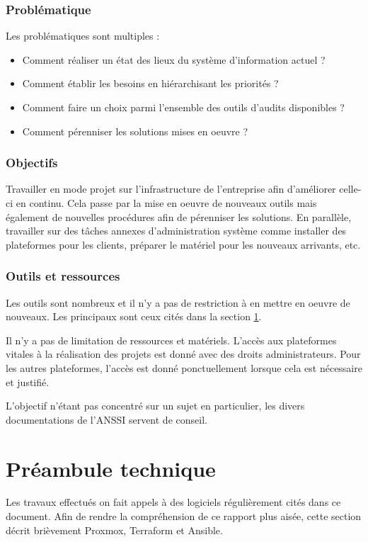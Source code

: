 \documentclass[12pt]{article}
\begin{document}
\subsubsection{Problématique}
Les problématiques sont multiples :
\begin{itemize}
    \item Comment réaliser un état des lieux du système d'information actuel ?
    \item Comment établir les besoins en hiérarchisant les priorités ?
    \item Comment faire un choix parmi l'ensemble des outils d'audits disponibles ?
    \item Comment pérenniser les solutions mises en oeuvre ? 
\end{itemize}

\subsubsection{Objectifs}
Travailler en mode projet sur l'infrastructure de l'entreprise afin d'améliorer celle-ci en continu. 
Cela passe par la mise en oeuvre de nouveaux outils mais également de nouvelles procédures afin de pérenniser les solutions. 
En parallèle, travailler sur des tâches annexes d'administration système comme installer des plateformes pour les clients, préparer le matériel pour les nouveaux arrivants, etc.

\subsubsection{Outils et ressources}
Les outils sont nombreux et il n'y a pas de restriction à en mettre en oeuvre de nouveaux. 
Les principaux sont ceux cités dans la section \ref{sec: preambule_technique}.

Il n'y a pas de limitation de ressources et matériels.
L'accès aux plateformes vitales à la réalisation des projets est donné avec des droits administrateurs.
Pour les autres plateformes, l'accès est donné ponctuellement lorsque cela est nécessaire et justifié.

L'objectif n'étant pas concentré sur un sujet en particulier, les divers documentations de l'ANSSI servent de conseil.

\newpage
\section{Préambule technique}
\label{sec: preambule_technique}
Les travaux effectués on fait appels à des logiciels régulièrement cités dans ce document. 
Afin de rendre la compréhension de ce rapport plus aisée, cette section décrit brièvement Proxmox, Terraform et Ansible.
\end{document}
